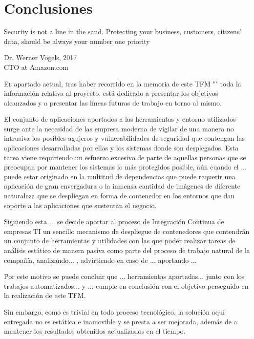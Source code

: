 \chapter{Conclusiones}\label{chp-05}
\epigraph{Security is not a line in the sand. Protecting your business, customers, citizens’ data, should be always your number one priority}{Dr. Werner Vogels, 2017\\CTO at Amazon.com}

\lettrine[lraise=-0.1, lines=2, loversize=0.2]{E}{l} apartado actual, tras haber recorrido en la memoria de este \gls{TFM} "\eltitulo" toda la información relativa al proyecto, está dedicado a presentar los objetivos alcanzados y a presentar las líneas futuras de trabajo en torno al mismo. 

El conjunto de aplicaciones aportados a las herramientas y entorno utilizados surge ante la necesidad de las empresa moderna de vigilar de una manera no intrusiva los posibles agujeros y vulnerabilidades de seguridad que contengan las aplicaciones desarrolladas por ellas y los sistemas donde son desplegados. Esta tarea viene requiriendo un esfuerzo excesivo de parte de aquellas personas que se preocupan por mantener los sistemas lo más protegidos posible, aún cuando el ... puede estar originado en la multitud de dependencias que puede requerir una aplicación de gran envergadura o la inmensa cantidad de imágenes de diferente naturaleza que se despliegan en forma de contenedor en los entornos que dan soporte a las aplicaciones que sustentan el negocio.

Siguiendo esta ... se decide aportar al proceso de Integración Continua de empresas \gls{TI} un sencillo mecanismo de despliegue de contenedores que contendrán un conjunto de herramientas y utilidades con las que poder realizar tareas de análisis estático de manera pasiva como parte del proceso de trabajo natural de la compañía, analizando... , advirtiendo en caso de ... aportando ...

Por este motivo se puede concluir que ... herramientas aportadas... junto con los trabajos automatizados... y ... cumple en conclusión con el objetivo perseguido en la realización de este \gls{TFM}.

Sin embargo, como es trivial en todo proceso tecnológico, la solución aquí entregada no es estática e inamovible y se presta a ser mejorada, además de a mantener los resultados obtenidos actualizados en el tiempo.

